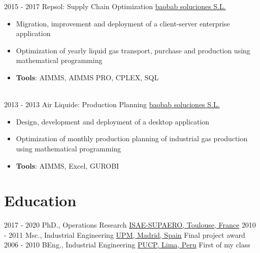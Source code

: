 \documentclass[letterpaper]{twentysecondcv} %
\begin{document}
\begin{twenty}
      {2015 - 2017 }
    {}
        {Repsol: Supply Chain Optimization}
        {\href{https://baobabsoluciones.es/en/}{baobab soluciones S.L.}}
        {}
        {
        {\begin{itemize}
        \item Migration, improvement and deployment of a client-server enterprise application
        \item Optimization of yearly liquid gas transport, purchase and production using mathematical programming
        \item \textbf{Tools}: AIMMS, AIMMS PRO, CPLEX, SQL
        \vspace{2mm}
    \end{itemize}}
        }
  \\
  \twentyitem
      {2013 - 2013 }
    {}
        {Air Liquide: Production Planning}
        {\href{https://baobabsoluciones.es/en/}{baobab soluciones S.L.}}
        {}
        {
        {\begin{itemize}
        \item Design, development and deployment of a desktop application
        \item Optimization of monthly production planning of industrial gas production using mathematical programming
        \item \textbf{Tools}: AIMMS, Excel, GUROBI
        \vspace{2mm}
    \end{itemize}}
        }
\end{twenty}
\vspace{-0.5cm}
\section{Education}

\begin{twenty} %
  \twentyitemshorttest
      {2017 - 2020}
        {}
        {PhD., Operations Research}
        {\href{https://www.isae-supaero.fr/en/}{ISAE-SUPAERO, Toulouse, France}}
        {}   
  \twentyitemshorttest
      {2010 - 2011}
    {}
        {Msc., Industrial Engineering}
        {\href{https://www.upm.es/internacional}{UPM, Madrid, Spain}}
        {Final project award}
  \twentyitemshorttest
      {2006 - 2010}
    {}
        {BEng., Industrial Engineering}
        {\href{https://www.pucp.edu.pe/}{PUCP, Lima, Peru}}
        {First of my class}
\end{twenty}
\end{document}
